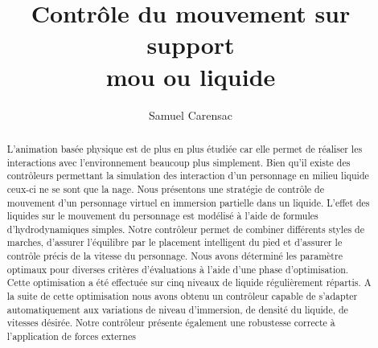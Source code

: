 \documentclass[runningheads,a4paper]{llncs}
\begin{document}
\mainmatter  %

\title{Contrôle du mouvement sur support\\ mou ou liquide}


%
%
\author{Samuel Carensac}
%


%
%

\maketitle


\begin{abstract}
 L'animation basée physique est de plus en plus étudiée car elle permet de réaliser les interactions avec l'environnement beaucoup plus simplement. Bien qu'il existe des contrôleurs permettant la simulation des interaction d'un personnage en milieu liquide ceux-ci ne se sont que la nage. Nous présentons une stratégie de contrôle de mouvement d'un personnage virtuel en immersion partielle dans un liquide. L'effet des liquides sur le mouvement du personnage est modélisé à l'aide de formules d'hydrodynamiques simples. Notre contrôleur permet de combiner différents styles de marches, d'assurer l'équilibre par le placement intelligent du pied et d'assurer le contrôle précis de la vitesse du personnage. Nous avons déterminé les paramètre optimaux pour diverses critères d'évaluations à l'aide d'une phase d'optimisation. Cette optimisation a été effectuée sur cinq niveaux de liquide régulièrement répartis.
A la suite de cette optimisation nous avons obtenu un contrôleur capable de s'adapter automatiquement aux variations de niveau d'immersion, de densité du liquide, de vitesses désirée. Notre contrôleur présente également une robustesse correcte à l'application de forces externes
\end{abstract}
\end{document}
